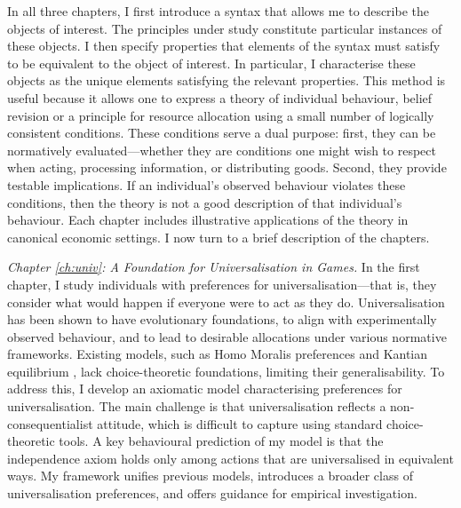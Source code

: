 In all three chapters, I first introduce a syntax that allows me to describe the objects of interest. The principles under study constitute particular instances of these objects. I then specify properties that elements of the syntax must satisfy to be equivalent to the object of interest. In particular, I characterise these objects as the unique elements satisfying the relevant properties. This method is useful because it allows one to express a theory of individual behaviour, belief revision or a principle for resource allocation using a small number of logically consistent conditions. These conditions serve a dual purpose: first, they can be normatively evaluated—whether they are conditions one might wish to respect when acting, processing information, or distributing goods. Second, they provide testable implications. If an individual’s observed behaviour violates these conditions, then the theory is not a good description of that individual’s behaviour. Each chapter includes illustrative applications of the theory in canonical economic settings. I now turn to a brief description of the chapters.

\emph{Chapter \ref{ch:univ}: A Foundation for Universalisation in Games.} In the first chapter, I study individuals with preferences for universalisation—that is, they consider what would happen if everyone were to act as they do. Universalisation has been shown to have evolutionary foundations, to align with experimentally observed behaviour, and to lead to desirable allocations under various normative frameworks. Existing models, such as Homo Moralis preferences \citep{algerHomoMoralisPreference2013} and Kantian equilibrium \citep{roemer2019we}, lack choice-theoretic foundations, limiting their generalisability. To address this, I develop an axiomatic model characterising preferences for universalisation. The main challenge is that universalisation reflects a non-consequentialist attitude, which is difficult to capture using standard choice-theoretic tools. A key behavioural prediction of my model is that the independence axiom holds only among actions that are universalised in equivalent ways. My framework unifies previous models, introduces a broader class of universalisation preferences, and offers guidance for empirical investigation.

